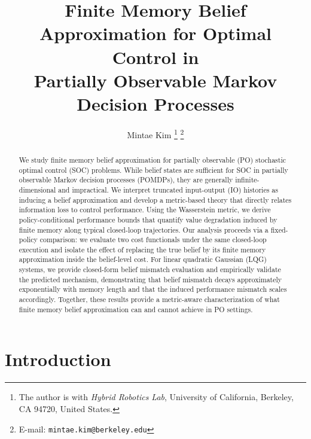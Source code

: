 \documentclass[letterpaper, 10 pt, conference]{ieeeconf}
\title{\LARGE \bf
Finite Memory Belief Approximation for Optimal Control in \\ Partially Observable Markov Decision Processes
}
\author{Mintae Kim
\thanks{The author is with \textit{Hybrid Robotics Lab}, University of California, Berkeley, CA 94720, United States.}
\thanks{E-mail: \texttt{mintae.kim@berkeley.edu}}
}
\begin{document}
\maketitle
\thispagestyle{empty}
\pagestyle{empty}




\begin{abstract}

We study finite memory belief approximation for partially observable (PO) stochastic optimal control (SOC) problems.
While belief states are sufficient for SOC in partially observable Markov decision processes (POMDPs), they are generally infinite-dimensional and impractical.
We interpret truncated input-output (IO) histories as inducing a belief approximation and develop a metric-based theory that directly relates information loss to control performance.
Using the Wasserstein metric, we derive policy-conditional performance bounds that quantify value degradation induced by finite memory along typical closed-loop trajectories.
Our analysis proceeds via a fixed-policy comparison: we evaluate two cost functionals under the same closed-loop execution and isolate the effect of replacing the true belief by its finite memory approximation inside the belief-level cost.
For linear quadratic Gaussian (LQG) systems, we provide closed-form belief mismatch evaluation and empirically validate the predicted mechanism, demonstrating that belief mismatch decays approximately exponentially with memory length and that the induced performance mismatch scales accordingly.
Together, these results provide a metric-aware characterization of what finite memory belief approximation can and cannot achieve in PO settings.
\end{abstract}

\begingroup
\renewcommand{\thefootnote}{}
\endgroup



\section{Introduction}
\end{document}
